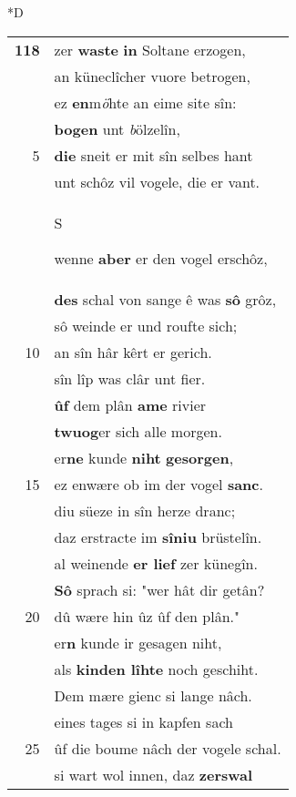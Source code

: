 \documentclass[8pt,a4paper,notitlepage]{article}
\begin{document}
\begin{table}[ht]
\begin{minipage}[t]{0.5\linewidth}
\small
\begin{center}*D
\end{center}
\begin{tabular}{rl}
\textbf{118} & zer \textbf{waste} \textbf{in} Soltane erzogen,\\ 
 & an küneclîcher vuore betrogen,\\ 
 & ez \textbf{en}m\textit{ö}hte an eime site sîn:\\ 
 & \textbf{bogen} unt \textit{b}ölzelîn,\\ 
5 & \textbf{die} sneit er mit sîn selbes hant\\ 
 & unt schôz vil vogele, die er vant.\\ 
 & \begin{large}S\end{large}wenne \textbf{aber} er den vogel erschôz,\\ 
 & \textbf{des} schal von sange ê was \textbf{sô} grôz,\\ 
 & sô weinde er und roufte sich;\\ 
10 & an sîn hâr kêrt er gerich.\\ 
 & sîn lîp was clâr unt fier.\\ 
 & \textbf{ûf} dem plân \textbf{ame} rivier\\ 
 & \textbf{twuog}er sich alle morgen.\\ 
 & er\textbf{ne} kunde \textbf{niht} \textbf{gesorgen},\\ 
15 & ez enwære ob im der vogel \textbf{sanc}.\\ 
 & diu süeze in sîn herze dranc;\\ 
 & daz erstracte im \textbf{sîniu} brüstelîn.\\ 
 & al weinende \textbf{er lief} zer künegîn.\\ 
 & \textbf{Sô} sprach si: "wer hât dir getân?\\ 
20 & dû wære hin ûz ûf den plân."\\ 
 & er\textbf{n} kunde ir gesagen niht,\\ 
 & als \textbf{kinden lîhte} noch geschiht.\\ 
 & Dem mære gienc si lange nâch.\\ 
 & eines tages si in kapfen sach\\ 
25 & ûf die boume nâch der vogele schal.\\ 
 & si wart wol innen, daz \textbf{zerswal}\\ 

\end{tabular}
\end{minipage}
\end{table}
\end{document}
